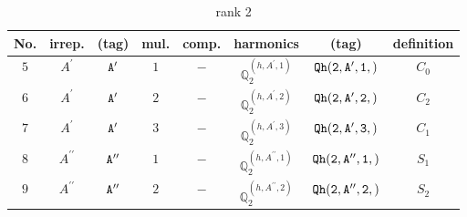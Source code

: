 \documentclass[fleqn,8pt]{jsarticle}
\begin{document}
\begin{table}[ht!]
\begin{center}
\caption{rank 2}
\renewcommand{\arraystretch}{1.3}
\begin{tabular}{cccccccc} \hline \hline
No. & irrep. & (tag) & mul. & comp. & harmonics & (tag) & definition \\ \hline
$ 5 $ & $ A^{\prime} $ & $ {\tt A'} $ & $ 1 $ & $ - $ & $ \mathbb{Q}_{2}^{(h,A^{\prime},1)} $ & $ {\tt Qh(2,A',1,)} $ & $ C_{0} $ \\
$ 6 $ & $ A^{\prime} $ & $ {\tt A'} $ & $ 2 $ & $ - $ & $ \mathbb{Q}_{2}^{(h,A^{\prime},2)} $ & $ {\tt Qh(2,A',2,)} $ & $ C_{2} $ \\
$ 7 $ & $ A^{\prime} $ & $ {\tt A'} $ & $ 3 $ & $ - $ & $ \mathbb{Q}_{2}^{(h,A^{\prime},3)} $ & $ {\tt Qh(2,A',3,)} $ & $ C_{1} $ \\
$ 8 $ & $ A^{\prime\prime} $ & $ {\tt A''} $ & $ 1 $ & $ - $ & $ \mathbb{Q}_{2}^{(h,A^{\prime\prime},1)} $ & $ {\tt Qh(2,A'',1,)} $ & $ S_{1} $ \\
$ 9 $ & $ A^{\prime\prime} $ & $ {\tt A''} $ & $ 2 $ & $ - $ & $ \mathbb{Q}_{2}^{(h,A^{\prime\prime},2)} $ & $ {\tt Qh(2,A'',2,)} $ & $ S_{2} $ \\
 \hline \hline
\end{tabular}
\end{center}
\end{table}
\end{document}
